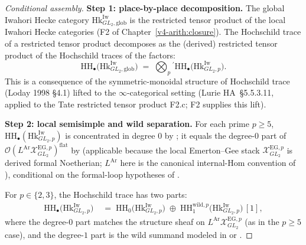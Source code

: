 \begin{proof}[Conditional assembly]
\medskip\noindent\textbf{Step 1: place-by-place decomposition.} The global
Iwahori Hecke category \(\mathrm{Hk}^{\mathrm{Iw}}_{GL_{2},\mathrm{glob}}\)
is the restricted tensor product of the local Iwahori Hecke
categories (F2 of Chapter~\ref{v4-arith:closure}). The
Hochschild trace of a restricted tensor product decomposes as the
(derived) restricted tensor product of the Hochschild traces of
the factors:
\begin{equation}
\mathrm{HH}_{\bullet}\bigl(\mathrm{Hk}^{\mathrm{Iw}}_{GL_{2},\mathrm{glob}}\bigr)
\;=\;\bigotimes_{p}{}^{\prime}\mathrm{HH}_{\bullet}\bigl(\mathrm{Hk}^{\mathrm{Iw}}_{GL_{2},p}\bigr).
\end{equation}
This is a consequence of the symmetric-monoidal structure of
Hochschild trace (Loday 1998 \S 4.1) lifted to the
\(\infty\)-categorical setting (Lurie HA~\S 5.5.3.11, applied to the
Tate restricted tensor product F2.c; F2 supplies this lift).

\medskip\noindent\textbf{Step 2: local semisimple and wild separation.}
For each prime \(p\geq 5\), \(\mathrm{HH}_{\bullet}(\mathrm{Hk}^{\mathrm{Iw}}_{GL_{2},p})\)
is concentrated in degree \(0\) by
;
it equals the degree-\(0\) part of
\(\mathcal{O}(L^{\mathrm{Ar}}\mathcal{X}^{\mathrm{EG},p}_{GL_{2}})^{\mathrm{flat}}\)
by  (applicable because
the local Emerton--Gee stack \(\mathcal{X}^{\mathrm{EG},p}_{GL_{2}}\)
is derived formal Noetherian; \(L^{\mathrm{Ar}}\) here is the
canonical internal-Hom convention of
), conditional on
the formal-loop hypotheses of
.

For \(p\in\{2,3\}\), the Hochschild trace has two parts:
\begin{align}
\mathrm{HH}_{\bullet}\bigl(\mathrm{Hk}^{\mathrm{Iw}}_{GL_{2},p}\bigr)
&\;=\;\mathrm{HH}_{0}\bigl(\mathrm{Hk}^{\mathrm{Iw}}_{GL_{2},p}\bigr)
\;\oplus\;\mathrm{HH}_{1}^{\mathrm{wild},p}\bigl(\mathrm{Hk}^{\mathrm{Iw}}_{GL_{2},p}\bigr)\,[1],
\end{align}
where the degree-\(0\) part matches the structure sheaf on
\(L^{\mathrm{Ar}}\mathcal{X}^{\mathrm{EG},p}_{GL_{2}}\) (as in the
\(p\geq 5\) case), and the degree-\(1\) part is the wild
summand modeled in
 or
.


\end{proof}
